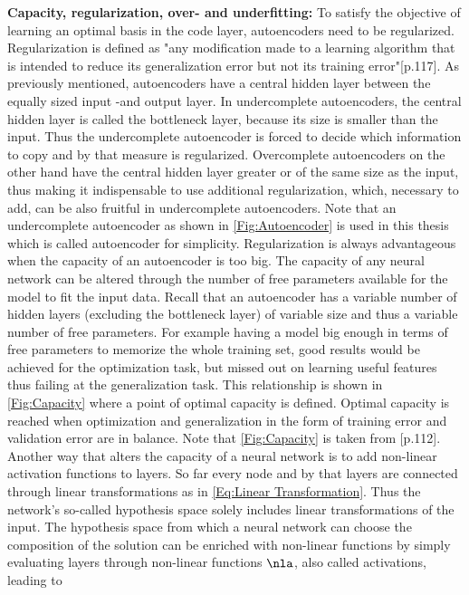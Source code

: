 \textbf{Capacity, regularization, over- and underfitting:} To satisfy the objective of learning an optimal basis in the code layer, autoencoders need to be regularized. Regularization is defined as "any modification made to a learning algorithm that is intended to reduce its generalization error but not its training error"\cite{Goodfellow}[p.117]. As previously mentioned, autoencoders have a central hidden layer between the equally sized input -and output layer. In undercomplete autoencoders, the central hidden layer is called the bottleneck layer, because its size is smaller than the input. Thus the undercomplete autoencoder is forced to decide which information to copy and by that measure is regularized. Overcomplete autoencoders on the other hand have the central hidden layer greater or of the same size as the input, thus making it indispensable to use additional regularization, which, necessary to add, can be also fruitful in undercomplete autoencoders. Note that an undercomplete autoencoder as shown in \cref{Fig:Autoencoder} is used in this thesis which is called autoencoder for simplicity. Regularization is always advantageous when the capacity of an autoencoder is too big. The capacity of any neural network can be altered through the number of free parameters available for the model to fit the input data. Recall that an autoencoder has a variable number of hidden layers (excluding the bottleneck layer) of variable size and thus a variable number of free parameters. For example having a model big enough in terms of free parameters to memorize the whole training set, good results would be achieved for the optimization task, but missed out on learning useful features thus failing at the generalization task. This relationship is shown in \cref{Fig:Capacity} where a point of optimal capacity is defined. Optimal capacity is reached when optimization and generalization in the form of training error and validation error are in balance. Note that \cref{Fig:Capacity} is taken from \cite{Goodfellow}[p.112]. Another way that alters the capacity of a neural network is to add non-linear activation functions to layers. So far every node and by that layers are connected through linear transformations as in \cref{Eq:Linear Transformation}. Thus the network's so-called hypothesis space solely includes linear transformations of the input. The hypothesis space from which a neural network can choose the composition of the solution can be enriched with non-linear functions by simply evaluating layers through non-linear functions \(\nla\), also called activations, leading to
